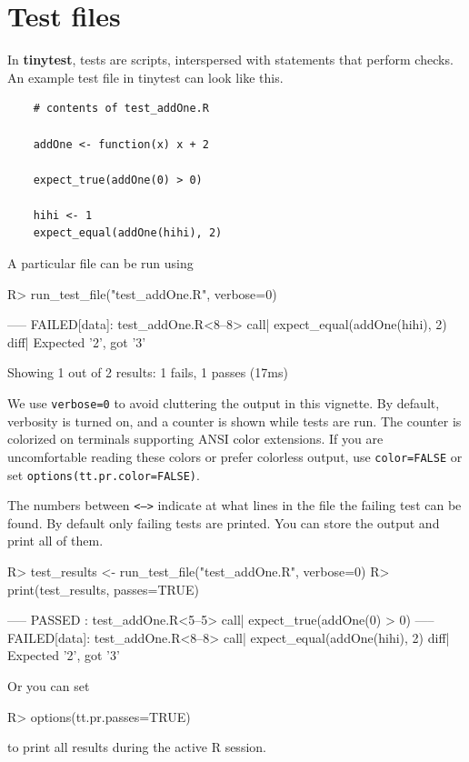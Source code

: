 \documentclass[11pt]{article}
\newcommand{\code}[1]{\texttt{#1}}
\newcommand{\pkg}[1]{\textbf{#1}}
\let\oldmarginpar\marginpar
\renewcommand{\marginpar}[1]{\oldmarginpar{\color{bluetext}\raggedleft\scriptsize #1}}
\begin{document}
\section{Test files}
\label{sect:testfiles}
In \pkg{tinytest}, tests are scripts, interspersed with statements that perform
checks. An example test file in tinytest can look like this.


\begin{verbatim}
    # contents of test_addOne.R

    addOne <- function(x) x + 2

    expect_true(addOne(0) > 0)

    hihi <- 1
    expect_equal(addOne(hihi), 2)
\end{verbatim}

A particular file can be run using\marginpar{\code{run\_test\_file}}
\begin{Schunk}
\begin{Sinput}
R>  run_test_file("test_addOne.R", verbose=0)
\end{Sinput}
\begin{Soutput}
----- FAILED[data]: test_addOne.R<8--8>
 call| expect_equal(addOne(hihi), 2)
 diff| Expected '2', got '3'
 
Showing 1 out of 2 results: 1 fails, 1 passes (17ms)
\end{Soutput}
\end{Schunk}
We use \code{verbose=0} to avoid cluttering the output in this vignette.  By
default, verbosity is turned on, and a counter is shown while tests are run.
The counter is colorized on terminals supporting ANSI color extensions. If you
are uncomfortable reading these colors or prefer colorless output, use
\code{color=FALSE} or set \code{options(tt.pr.color=FALSE)}.


The numbers between \code{<-->} indicate at what lines in the file the failing
test can be found.
By default only failing tests are  printed. You can store the output and print 
all of them.
\begin{Schunk}
\begin{Sinput}
R>  test_results <- run_test_file("test_addOne.R", verbose=0)
R>  print(test_results, passes=TRUE)
\end{Sinput}
\begin{Soutput}
----- PASSED      : test_addOne.R<5--5>
 call| expect_true(addOne(0) > 0)
 ----- FAILED[data]: test_addOne.R<8--8>
 call| expect_equal(addOne(hihi), 2)
 diff| Expected '2', got '3'
\end{Soutput}
\end{Schunk}
Or you can set
\begin{Schunk}
\begin{Sinput}
R>  options(tt.pr.passes=TRUE)
\end{Sinput}
\end{Schunk}
to print all results during the active R session.
\end{document}

